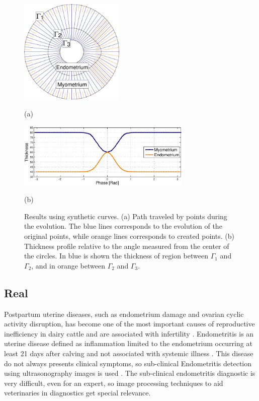 \documentclass{article}
\begin{document}
\begin{figure}[t]
\begin{minipage}[b]{1\linewidth}
  \centering
  \centerline{\includegraphics[width=5cm]{pics/synth}}
  \centerline{(a)}\medskip
\end{minipage}
\begin{minipage}[b]{1\linewidth}
  \centering
  \centerline{\includegraphics[width=8.3cm]{pics/synthWidth}}
  \centerline{(b)}\medskip
\end{minipage}
\caption{Results using synthetic curves. (a) Path traveled by points during the evolution. The blue lines corresponds to the evolution of the original points, while orange lines corresponds to created points. (b) Thickness profile relative to the angle measured from the center of the circles. In blue is shown the thickness of region between $\Gamma_1$ and $\Gamma_2$, and in orange between $\Gamma_2$ and $\Gamma_3$.}
\label{fig:synth}
\end{figure}

\subsection{Real}
\label{ssec:real}
Postpartum uterine diseases, such as endometrium damage and ovarian cyclic activity disruption, has become one of the most important causes of reproductive inefficiency in dairy cattle and are associated with infertility \cite{sheldon2008,barlund2008}. Endometritis is an uterine disease defined as inflammation limited to the endometrium occurring at least 21 days after calving and not associated with systemic illness \cite{sheldon2010}. This disease do not always presents clinical symptoms, so sub-clinical Endometritis detection using ultrasonography images is used \cite{Gianni2010, Gianni2013}. The sub-clinical endometritis diagnostic is very difficult, even for an expert, so image processing techniques to aid veterinaries in diagnostics get special relevance.
\end{document}
